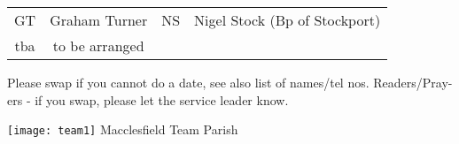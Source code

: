 \documentclass[10pt]{article}
\newif\ifpdf
\begin{document}
\begin{center}
\vspace{1em}
\begin{tabular}{|c|c|c|c|}\hline
 GT & Graham Turner & NS & Nigel Stock (Bp of Stockport)   \\
 tba & to be arranged & &  \\
     \hline
  \end{tabular}
\end{center}
\begin{minipage}{0.7\textwidth}
Please swap if you cannot do a date, see also list of names/tel nos.
Readers/Pray-ers - if you swap, please let the service leader know.
\end{minipage}
\begin{minipage}{0.3\textwidth}
\ifpdf
\fbox{
\texttt{[image: team1]} Macclesfield Team Parish
}
\else
\hspace{2em}
\texttt{[image: team1]} Macclesfield Team Parish
\fi
\end{minipage}
\end{document}
